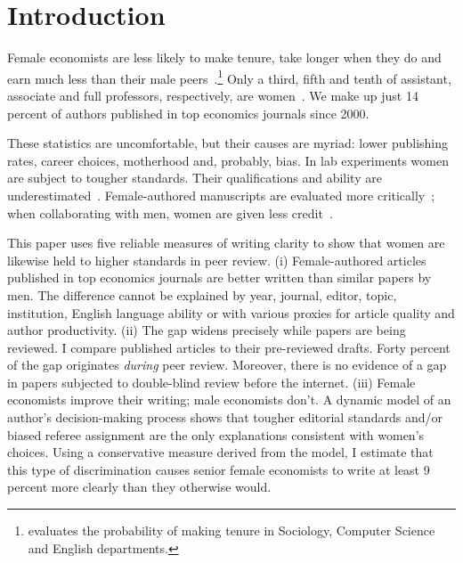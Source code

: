 \def\keywords{gender, readability, discrimination}
\def\subject{Gender bias}
\def\jel{A11, J16, J24}
\def\wordcount{20,300}


\section{Introduction}
\label{introduction}

Female economists are less likely to make tenure, take longer when they do and earn much less than their male peers~\citep{Bandiera2016,Ceci2014,Ginther2004,Weisshaar2017}.\footnote{\citet{Weisshaar2017} evaluates the probability of making tenure in Sociology, Computer Science and English departments.} Only a third, fifth and tenth of assistant, associate and full professors, respectively, are women~\citep{Romero2013}. We make up just 14 percent of authors published in top economics journals since 2000.

These statistics are uncomfortable, but their causes are myriad: lower publishing rates, career choices, motherhood and, probably, bias. In lab experiments women are subject to tougher standards. Their qualifications and ability are underestimated~\citep{Foschi1996,Grunspan2016,Moss-Racusin2012,Reuben2014}. Female-authored manu\-scripts are evaluated more critically~\citep{Goldberg1968,Krawczyk2016,Paludi1983}; when collaborating with men, women are given less credit~\citep{Heilman2005,Sarsons2015}.

This paper uses five reliable measures of writing clarity to show that women are likewise held to higher standards in peer review. (i) Female-authored articles published in top economics journals are better written than similar papers by men. The difference cannot be explained by year, journal, editor, topic, institution, English language ability or with various proxies for article quality and author productivity. (ii) The gap widens precisely while papers are being reviewed. I compare published articles to their pre-reviewed drafts. Forty percent of the gap originates \emph{during} peer review. Moreover, there is no evidence of a gap in papers subjected to double-blind review before the internet. (iii) Female economists improve their writing; male economists don't. A dynamic model of an author's decision-making process shows that tougher editorial standards and\slash or biased referee assignment are the only explanations consistent with women's choices. Using a conservative measure derived from the model, I estimate that this type of discrimination causes senior female economists to write at least 9 percent more clearly than they otherwise would.

